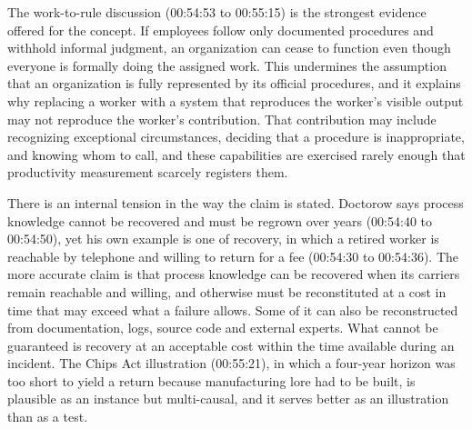 \documentclass[12pt]{article}
\newcommand{\ts}[1]{(#1)}
\begin{document}
The work-to-rule discussion \ts{00:54:53 to 00:55:15} is the strongest evidence offered for the concept. If employees follow only documented procedures and withhold informal judgment, an organization can cease to function even though everyone is formally doing the assigned work. This undermines the assumption that an organization is fully represented by its official procedures, and it explains why replacing a worker with a system that reproduces the worker's visible output may not reproduce the worker's contribution. That contribution may include recognizing exceptional circumstances, deciding that a procedure is inappropriate, and knowing whom to call, and these capabilities are exercised rarely enough that productivity measurement scarcely registers them.

There is an internal tension in the way the claim is stated. Doctorow says process knowledge cannot be recovered and must be regrown over years \ts{00:54:40 to 00:54:50}, yet his own example is one of recovery, in which a retired worker is reachable by telephone and willing to return for a fee \ts{00:54:30 to 00:54:36}. The more accurate claim is that process knowledge can be recovered when its carriers remain reachable and willing, and otherwise must be reconstituted at a cost in time that may exceed what a failure allows. Some of it can also be reconstructed from documentation, logs, source code and external experts. What cannot be guaranteed is recovery at an acceptable cost within the time available during an incident. The Chips Act illustration \ts{00:55:21}, in which a four-year horizon was too short to yield a return because manufacturing lore had to be built, is plausible as an instance but multi-causal, and it serves better as an illustration than as a test.
\end{document}
